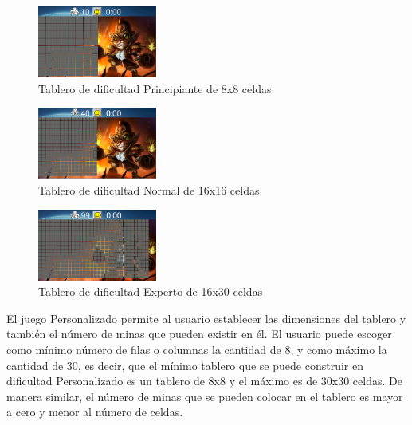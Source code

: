 \documentclass[11pt]{article} %
\begin{document}
\begin{center}

	\begin{figure}[h!]
  		\centering
    		\includegraphics[width=0.35\textwidth]{imagenes/tableroPrincipiante.PNG}
  		\caption{Tablero de dificultad Principiante de 8x8 celdas}
		\label{fig:tableroprincipiante}
	\end{figure}
\end{center} 

\begin{center}

	\begin{figure}[h!]
  		\centering
    		\includegraphics[width=0.35\textwidth]{imagenes/tableroNormal.PNG}
  		\caption{Tablero de dificultad Normal de 16x16 celdas}
		\label{fig:tableronormal}
	\end{figure}
\end{center} 

\begin{center}

	\begin{figure}[h!]
  		\centering
    		\includegraphics[width=0.35\textwidth]{imagenes/tableroDificil.PNG}
  		\caption{Tablero de dificultad Experto de 16x30 celdas}
		\label{fig:tableroexperto}
	\end{figure}
\end{center} 

El juego Personalizado permite al usuario establecer las dimensiones del tablero y tambi\'en el n\'umero de minas que pueden existir en \'el. El usuario puede escoger como m\'inimo n\'umero de filas o columnas la cantidad de 8, y como m\'aximo la cantidad de 30, es decir, que el m\'inimo tablero que se puede construir en dificultad Personalizado es un tablero de 8x8 y el m\'aximo es de 30x30 celdas. De manera similar, el n\'umero de minas que se pueden colocar en el tablero es mayor a cero y menor al n\'umero de celdas. 
\end{document}
